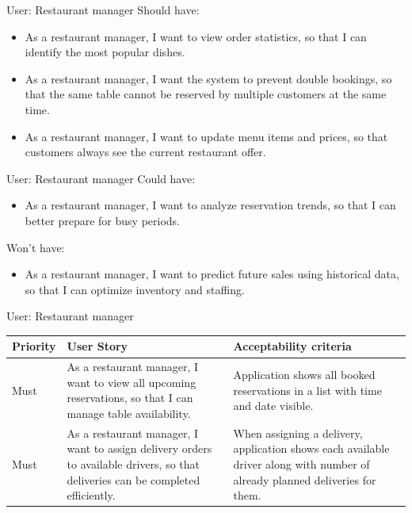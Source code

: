 \documentclass{beamer}
\begin{document}
\begin{frame}{User: Restaurant manager}
Should have:
\begin{itemize}
\item As a restaurant manager, I want to view order statistics, so that I can identify the most popular dishes.
\item As a restaurant manager, I want the system to prevent double bookings, so that the same table cannot be reserved by multiple customers at the same time.
\item As a restaurant manager, I want to update menu items and prices, so that customers always see the current restaurant offer.
\end{itemize}
\end{frame}

\begin{frame}{User: Restaurant manager}
Could have:
\begin{itemize}
\item As a restaurant manager, I want to analyze reservation trends, so that I can better prepare for busy periods.
\end{itemize}
Won't have:
\begin{itemize}
\item As a restaurant manager, I want to predict future sales using historical data, so that I can optimize inventory and staffing.
\end{itemize}
\end{frame}

\begin{frame}{User: Restaurant manager}
\begin{tabular}{| l | p{4cm} | p{4cm} |}
\hline
Priority & User Story & Acceptability criteria \\
\hline
Must & As a restaurant manager, I want to view all upcoming reservations, so that I can manage table availability.
     & Application shows all booked reservations in a list with time and date visible. \\
\hline
Must & As a restaurant manager, I want to assign delivery orders to available drivers, so that deliveries can be completed efficiently.
     & When assigning a delivery, application shows each available driver along with number of already planned deliveries for them. \\
\hline
\end{tabular}
\end{frame}
\end{document}
